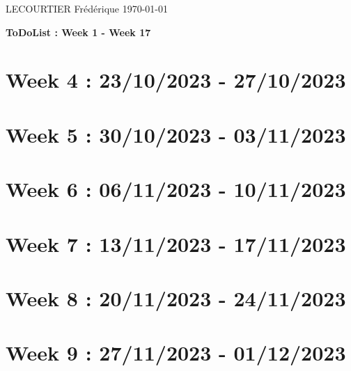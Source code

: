 \documentclass{article}
\begin{document}
	LECOURTIER Frédérique \hfill \today
	\begin{center}
		\Large\textbf{{ToDoList : Week 1 - Week 17}}
	\end{center}
	\tableofcontents

	\newpage

	\section*{Week 4 : 23/10/2023 - 27/10/2023}
	

	\newpage

	\section*{Week 5 : 30/10/2023 - 03/11/2023}
	

	\newpage

	\section*{Week 6 : 06/11/2023 - 10/11/2023}
	

	\newpage

	\section*{Week 7 : 13/11/2023 - 17/11/2023}
	

	\newpage

	\section*{Week 8 : 20/11/2023 - 24/11/2023}
	

	\newpage

	\section*{Week 9 : 27/11/2023 - 01/12/2023}
	

	\newpage
\end{document}
